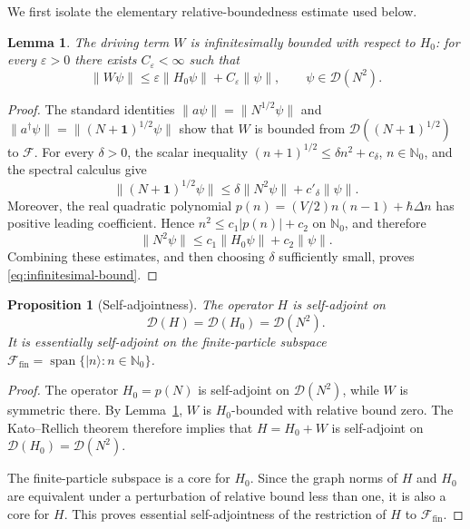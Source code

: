 \documentclass[11pt]{article}
\newtheorem{proposition}[theorem]{Proposition}
\newtheorem{lemma}[theorem]{Lemma}
\theoremstyle{remark}
\newcommand{\Fock}{\mathcal{F}}
\newcommand{\Dom}{\mathcal{D}}
\newcommand{\Nzero}{\mathbb{N}_{0}}
\newcommand{\id}{\mathbf{1}}
\begin{document}
We first isolate the elementary relative-boundedness estimate used below.

\begin{lemma}\label{lem:relative-bound}
The driving term \(W\) is infinitesimally bounded with respect to \(H_0\): for
every \(\varepsilon>0\) there exists \(C_\varepsilon<\infty\) such that
\begin{equation}
 \|W\psi\|\leq \varepsilon\|H_0\psi\|
       +C_\varepsilon\|\psi\|,
 \qquad \psi\in\Dom(N^2).
 \label{eq:infinitesimal-bound}
\end{equation}
\end{lemma}

\begin{proof}
The standard identities
\(
 \|a\psi\|=\|N^{1/2}\psi\|
\)
and
\(
 \|a^\dagger\psi\|=\|(N+\id)^{1/2}\psi\|
\)
show that \(W\) is bounded from \(\Dom((N+\id)^{1/2})\) to \(\Fock\).
For every \(\delta>0\), the scalar inequality
\((n+1)^{1/2}\leq\delta n^2+c_\delta\), \(n\in\Nzero\), and the spectral
calculus give
\begin{equation}
 \|(N+\id)^{1/2}\psi\|
 \leq \delta\|N^2\psi\|+c'_{\delta}\|\psi\|.
 \label{eq:Nhalf-Ntwo}
\end{equation}
Moreover, the real quadratic polynomial
\(p(n)=(V/2)n(n-1)+\hbar\Delta n\) has positive leading coefficient.  Hence
\(n^2\leq c_1|p(n)|+c_2\) on \(\Nzero\), and therefore
\begin{equation}
 \|N^2\psi\|\leq c_1\|H_0\psi\|+c_2\|\psi\|.
 \label{eq:Ntwo-Hzero}
\end{equation}
Combining these estimates, and then choosing \(\delta\) sufficiently small,
proves \eqref{eq:infinitesimal-bound}.
\end{proof}

\begin{proposition}[Self-adjointness]\label{prop:self-adjoint}
The operator \(H\) is self-adjoint on
\begin{equation}
 \Dom(H)=\Dom(H_0)=\Dom(N^2).
 \label{eq:domain}
\end{equation}
It is essentially self-adjoint on the finite-particle subspace
\(\Fock_{\mathrm{fin}}=\operatorname{span}\{|n\rangle:n\in\Nzero\}\).
\end{proposition}

\begin{proof}
The operator \(H_0=p(N)\) is self-adjoint on \(\Dom(N^2)\), while \(W\) is
symmetric there.  By Lemma~\ref{lem:relative-bound}, \(W\) is \(H_0\)-bounded
with relative bound zero.  The Kato--Rellich theorem
\cite{Kato1995Perturbation} therefore implies that
\(H=H_0+W\) is self-adjoint on \(\Dom(H_0)=\Dom(N^2)\).

The finite-particle subspace is a core for \(H_0\).  Since the graph norms of
\(H\) and \(H_0\) are equivalent under a perturbation of relative bound less
than one, it is also a core for \(H\).  This proves essential
self-adjointness of the restriction of \(H\) to \(\Fock_{\mathrm{fin}}\).
\end{proof}
\end{document}
